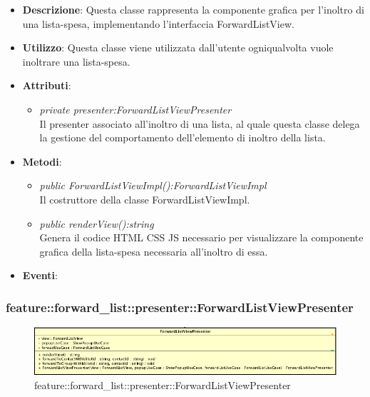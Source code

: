 \begin{itemize}
\item \textbf{Descrizione}: Questa classe rappresenta la componente grafica per l'inoltro di una lista-spesa, implementando l'interfaccia ForwardListView.
\item \textbf{Utilizzo}: Questa classe viene utilizzata dall'utente ogniqualvolta vuole inoltrare una lista-spesa.
\item \textbf{Attributi}:
\begin{itemize}
\item \textit{private presenter:ForwardListViewPresenter}\\
Il presenter associato all'inoltro di una lista, al quale questa classe delega la gestione del comportamento dell'elemento di inoltro della lista.
\end{itemize}
\item \textbf{Metodi}: 
	\begin{itemize}
	\item \textit{public ForwardListViewImpl():ForwardListViewImpl}\\
	Il costruttore della classe ForwardListViewImpl.
	\item \textit{public renderView():string}\\
		Genera il codice HTML CSS JS necessario per visualizzare la componente grafica della lista-spesa necessaria all'inoltro di essa.
	\end{itemize}
\item \textbf{Eventi}:
\end{itemize}

\subsubsection{feature::forward\_list::presenter::ForwardListViewPresenter}

\label{feature::forward_list::presenter::ForwardListViewPresenter}
\begin{figure}[ht]
	\centering
	\includegraphics[scale=0.5]{Sezioni/SottosezioniST/img/app/ForwardListViewPresenter.png}
	\caption{feature::forward\_list::presenter::ForwardListViewPresenter}
\end{figure}

